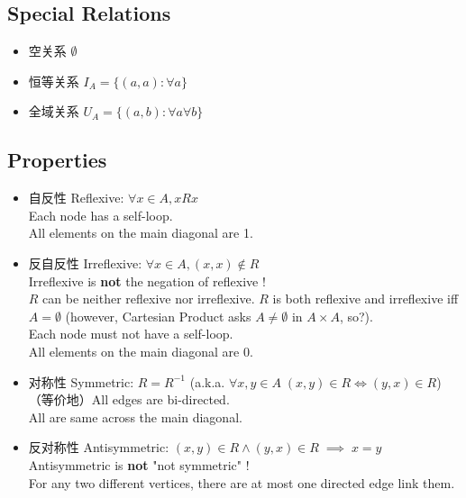 \documentclass[12pt, a4paper, UTF8, openany]{ctexbook}
\begin{document}
    \subsection{Special Relations}
        \begin{itemize}
            \item 空关系 $\emptyset$
            \item 恒等关系 $I_A = \{(a, a): \forall a\}$
            \item 全域关系 $U_A = \{(a, b): \forall a \forall b\}$
        \end{itemize}

    \subsection{Properties}
        \begin{itemize}
            \item 自反性 Reflexive: $\forall x \in A, x R x$ \\
                Each node has a self-loop. \\
                All elements on the main diagonal are 1.
            \item 反自反性 Irreflexive: $\forall x \in A, (x, x) \notin R$ \\
                Irreflexive is \textbf{not} the negation of reflexive ! \\
                $R$ can be neither reflexive nor irreflexive. $R$ is both reflexive and irreflexive iff $A = \emptyset$ (however, Cartesian Product asks $A \neq \emptyset$ in $A \times A$, so?). \\
                Each node must not have a self-loop. \\
                All elements on the main diagonal are 0.
            \item 对称性 Symmetric: $R = R^{-1}$ (a.k.a. $\forall x, y \in A \; (x, y) \in R \iff (y, x) \in R$) \\
                （等价地）All edges are bi-directed. \\
                All are same across the main diagonal.
            \item 反对称性 Antisymmetric: $(x, y) \in R \land (y, x) \in R \; \implies \; x = y$ \\
                Antisymmetric is \textbf{not} "not symmetric" ! \\
                For any two different vertices, there are at most one directed edge link them. \\

\end{itemize}
\end{document}
